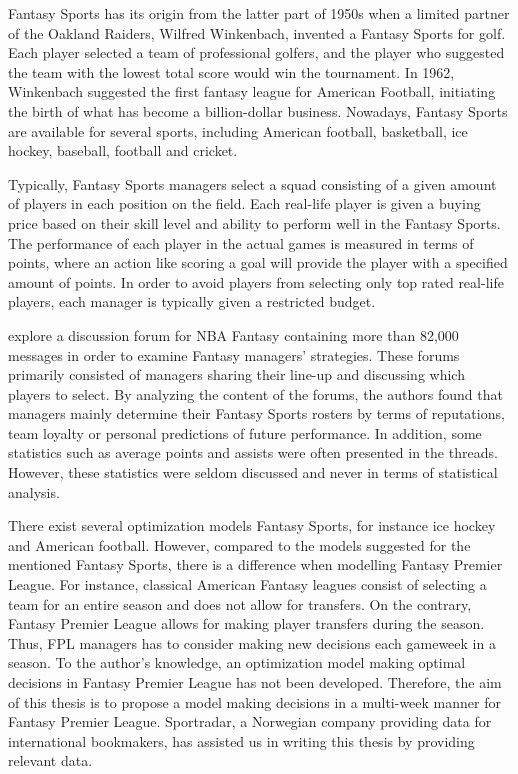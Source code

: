 \newpar

Fantasy Sports has its origin from the latter part of 1950s when a limited partner of the Oakland Raiders, Wilfred Winkenbach, invented a Fantasy Sports for golf. Each player selected a team of professional golfers, and the player who suggested the team with the lowest total score would win the tournament. In 1962, Winkenbach suggested the first fantasy league for American Football, initiating the birth of what has become a billion-dollar business. Nowadays, Fantasy Sports are available for several sports, including American football, basketball, ice hockey, baseball, football and cricket.  

\newpar

Typically, Fantasy Sports managers select a squad consisting of a given amount of players in each position on the field. Each real-life player is given a buying price based on their skill level and ability to perform well in the Fantasy Sports. The performance of each player in the actual games is measured in terms of points, where an action like scoring a goal will provide the player with a specified amount of points. In order to avoid players from selecting only top rated real-life players, each manager is typically given a restricted budget.

\newpar

 \cite{Smith} explore a discussion forum for NBA Fantasy containing more than 82,000 messages in order to examine Fantasy managers' strategies. These forums primarily consisted of managers sharing their line-up and discussing which players to select. By analyzing the content of the forums, the authors found that managers mainly determine their Fantasy Sports rosters by terms of reputations, team loyalty or personal predictions of future performance. In addition, some statistics such as average points and assists were often presented in the threads. However, these statistics were seldom discussed and never in terms of statistical analysis. 

\newpar

There exist several optimization models Fantasy Sports, for instance ice hockey \citep{drafting_hockey_pools} and American football\citep{Fry}. However, compared to the models suggested for the mentioned Fantasy Sports, there is a difference when modelling Fantasy Premier League. For instance, classical American Fantasy leagues consist of selecting a team for an entire season and does not allow for transfers. On the contrary, Fantasy Premier League allows for making player transfers during the season. Thus, FPL managers has to consider making new decisions each gameweek in a season. To the author's knowledge, an optimization model making optimal decisions in Fantasy Premier League has not been developed. Therefore, the aim of this thesis is to propose a model making decisions in a multi-week manner for Fantasy Premier League. Sportradar, a Norwegian company providing data for international bookmakers, has assisted us in writing this thesis by providing relevant data.



